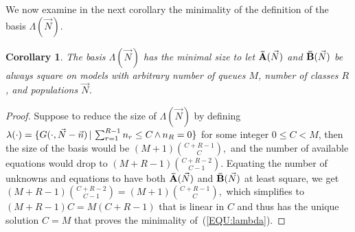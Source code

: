 \documentclass[journal,twocolumn,9.5pt]{IEEEtran}
\newtheorem{corollary}{Corollary}
\newcommand{\comom}[1]{\bar{#1}}
\begin{document}
We now examine in the next corollary the minimality of the definition of the basis ${\Lambda}(\vec N)$.
\begin{corollary}
\label{COR:minimal}
{\em
The basis ${\Lambda}(\vec N)$ has the minimal size to let ${\bf \comom{A}}(\vec N)$ and ${\bf \comom{B}}(\vec N)$ be always square on models with arbitrary number of queues $M$, number of classes $R$, and populations $\vec N$.}
\end{corollary}
\begin{proof}
Suppose to reduce the size of ${\Lambda}(\vec N)$ by defining
$
\lambda(\cdot)=\{G(\cdot,\vec N-\vec n)\,|\, \textstyle \sum_{r=1}^{R-1} n_r\leq C {\,\rm \wedge\,} n_R=0\}
$
for some integer $0\leq C<M$, then the size of the basis would be $(M+1){C+R-1\choose C},$ and the number of available equations would drop to
$(M+R-1){C+R-2\choose C-1}.$
Equating the number of unknowns and equations to have both ${\bf \comom{A}}(\vec N)$ and ${\bf \comom{B}}(\vec N)$ at least square, we get $(M+R-1){C+R-2\choose C-1}=(M+1){C+R-1\choose C},$
which simplifies to
${(M+R-1)}C=M{(C+R-1)}$ that is linear in $C$ and thus has the unique solution $C=M$ that proves the minimality of~(\ref{EQU:lambda}).
\end{proof}
\end{document}
